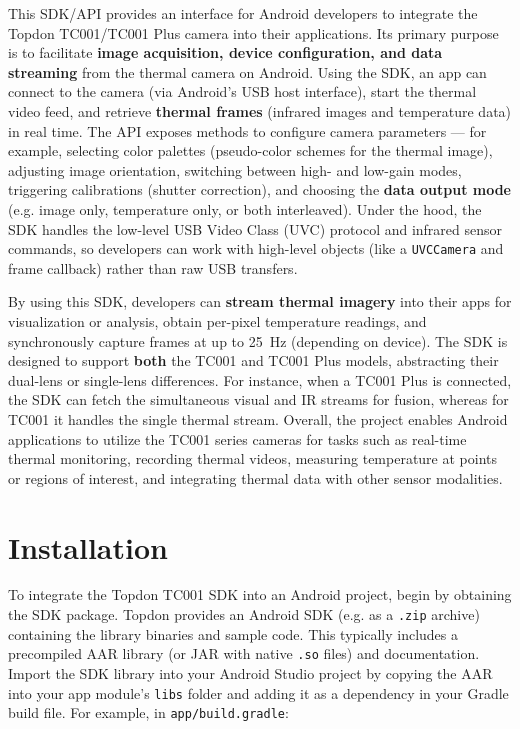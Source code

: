 This SDK/API provides an interface for Android developers to integrate
the Topdon TC001/TC001 Plus camera into their applications. Its primary
purpose is to facilitate \textbf{image acquisition, device configuration, and
data streaming} from the thermal camera on Android. Using the SDK, an
app can connect to the camera (via Android's USB host interface), start
the thermal video feed, and retrieve \textbf{thermal frames} (infrared images
and temperature data) in real time. The API exposes methods to configure
camera parameters --- for example, selecting color palettes (pseudo-color
schemes for the thermal image), adjusting image orientation, switching
between high- and low-gain modes, triggering calibrations (shutter
correction), and choosing the \textbf{data output mode} (e.g. image only,
temperature only, or both interleaved). Under the hood, the SDK handles
the low-level USB Video Class (UVC) protocol and infrared sensor
commands, so developers can work with high-level objects (like a
\texttt{UVCCamera} and frame callback) rather than raw USB transfers.

By using this SDK, developers can \textbf{stream thermal imagery} into their
apps for visualization or analysis, obtain per-pixel temperature
readings, and synchronously capture frames at up to 25 Hz (depending on
device)\cite{ref3}.
The SDK is designed to support \textbf{both} the TC001 and TC001 Plus models,
abstracting their dual-lens or single-lens differences. For instance,
when a TC001 Plus is connected, the SDK can fetch the simultaneous
visual and IR streams for fusion, whereas for TC001 it handles the
single thermal stream. Overall, the project enables Android applications
to utilize the TC001 series cameras for tasks such as real-time thermal
monitoring, recording thermal videos, measuring temperature at points or
regions of interest, and integrating thermal data with other sensor
modalities.

\section{Installation}

To integrate the Topdon TC001 SDK into an Android project, begin by
obtaining the SDK package. Topdon provides an Android SDK (e.g. as a
\texttt{.zip} archive) containing the library binaries and sample
code\cite{ref11}.
This typically includes a precompiled AAR library (or JAR with native
\texttt{.so} files) and documentation. Import the SDK library into your Android
Studio project by copying the AAR into your app module's \texttt{libs} folder
and adding it as a dependency in your Gradle build file. For example, in
\texttt{app/build.gradle}:

